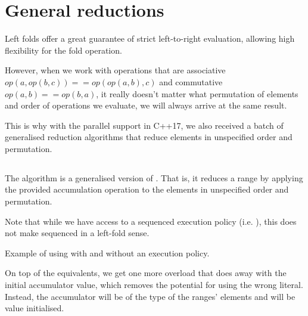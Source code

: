 \section{General reductions}

Left folds offer a great guarantee of strict left-to-right evaluation, allowing high flexibility for the fold operation.

However, when we work with operations that are associative $op(a, op(b,c)) == op(op(a,b),c)$ and commutative $op(a,b) == op(b,a)$, it really doesn’t matter what permutation of elements and order of operations we evaluate, we will always arrive at the same result.

This is why with the parallel support in C++17, we also received a batch of generalised reduction algorithms that reduce elements in unspecified order and permutation.

\subsection{\texorpdfstring{}{\texttt{std::reduce}}}

The  algorithm is a generalised version of . That is, it reduces a range by applying the provided accumulation operation to the elements in unspecified order and permutation.


Note that while we have access to a sequenced execution policy (i.e. \newline{}), this does not make  sequenced in a left-fold sense.

\begin{codebox}[]{\href{https://compiler-explorer.com/z/qxWsoM4Mf}{\ExternalLink}}
\footnotesize Example of using  with and without an execution policy.
\tcblower
{}
\end{codebox}

On top of the  equivalents, we get one more overload that does away with the initial accumulator value, which removes the potential for using the wrong literal. Instead, the accumulator will be of the type of the ranges’ elements and will be value initialised.

